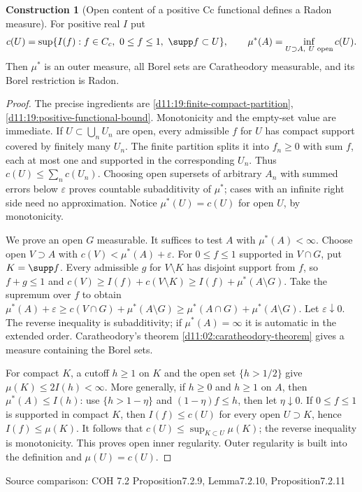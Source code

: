 \documentclass[11pt,oneside,openany]{book}
\theoremstyle{definition}
\newtheorem{construction}[theorem]{Construction}
\theoremstyle{remark}
\newcommand{\eps}{\varepsilon}\newcommand{\ee}{\varepsilon}
\newcommand{\family}[1]{}
\newcommand{\source}[1]{\par\begingroup\small\sffamily\color{black!65}Source comparison: #1\par\endgroup}
\begin{document}
\begin{construction}[Open content of a positive Cc functional defines a Radon measure]\family{D11.19.positive_content_measure}\label{d11:19:positive-content-measure}
For positive real $I$ put
\[c(U)=\sup\{I(f):f\in C_c,\ 0\le f\le1,\ \supp f\subset U\},\qquad
\mu^*(A)=\inf_{U\supset A,\ U\text{ open}}c(U).
\]
Then $\mu^*$ is an outer measure, all Borel sets are Caratheodory measurable, and its Borel restriction is Radon.
\end{construction}
\begin{proof}
The precise ingredients are \cref{d11:19:finite-compact-partition}, \cref{d11:19:positive-functional-bound}. Monotonicity and the empty-set value are immediate. If $U\subset\bigcup_n U_n$ are open, every admissible $f$ for $U$ has compact support covered by finitely many $U_n$. The finite partition splits it into $f_n\ge0$ with sum $f$, each at most one and supported in the corresponding $U_n$. Thus $c(U)\le\sum_n c(U_n)$. Choosing open supersets of arbitrary $A_n$ with summed errors below $\eps$ proves countable subadditivity of $\mu^*$; cases with an infinite right side need no approximation. Notice $\mu^*(U)=c(U)$ for open $U$, by monotonicity.

We prove an open $G$ measurable. It suffices to test $A$ with $\mu^*(A)<\infty$. Choose open $V\supset A$ with $c(V)<\mu^*(A)+\eps$. For $0\le f\le1$ supported in $V\cap G$, put $K=\supp f$. Every admissible $g$ for $V\setminus K$ has disjoint support from $f$, so $f+g\le1$ and
$c(V)\ge I(f)+c(V\setminus K)\ge I(f)+\mu^*(A\setminus G)$.
Take the supremum over $f$ to obtain
$\mu^*(A)+\eps\ge c(V\cap G)+\mu^*(A\setminus G)\ge\mu^*(A\cap G)+\mu^*(A\setminus G)$.
Let $\eps\downarrow0$. The reverse inequality is subadditivity; if $\mu^*(A)=\infty$ it is automatic in the extended order. Caratheodory's theorem \cref{d11:02:caratheodory-theorem} gives a measure containing the Borel sets.

For compact $K$, a cutoff $h\ge1$ on $K$ and the open set $\{h>1/2\}$ give $\mu(K)\le2I(h)<\infty$. More generally, if $h\ge0$ and $h\ge1$ on $A$, then $\mu^*(A)\le I(h)$: use $\{h>1-\eta\}$ and $(1-\eta)f\le h$, then let $\eta\downarrow0$. If $0\le f\le1$ is supported in compact $K$, then $I(f)\le c(U)$ for every open $U\supset K$, hence $I(f)\le\mu(K)$. It follows that $c(U)\le\sup_{K\subset U}\mu(K)$; the reverse inequality is monotonicity. This proves open inner regularity. Outer regularity is built into the definition and $\mu(U)=c(U)$.
\end{proof}
\source{COH 7.2 Proposition7.2.9, Lemma7.2.10, Proposition7.2.11}
\end{document}
